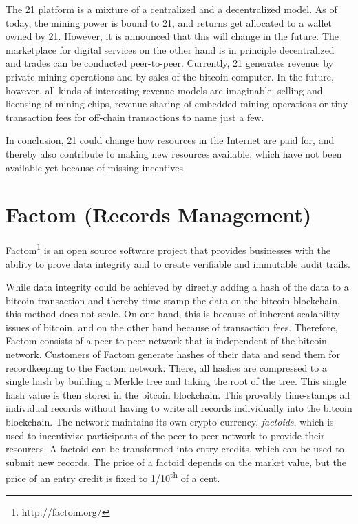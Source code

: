 The 21 platform is a mixture of a centralized and a decentralized model. As of 
today, the mining power is bound to 21, and returns get allocated to a wallet owned 
by 21. However, it is announced that this will change in the future. The marketplace 
for digital services on the other hand is in principle decentralized and trades 
can be conducted peer-to-peer. Currently, 21 generates revenue by private mining 
operations and by sales of the bitcoin computer. In the future, however, all kinds 
of interesting revenue models are imaginable: selling and licensing of mining chips, 
revenue sharing of embedded mining operations or tiny transaction fees for off-chain 
transactions to name just a few. 

In conclusion, 21 could change how resources in the Internet are paid for, and 
thereby also contribute to making new resources available, which have not been 
available yet because of missing incentives

\section{Factom (Records Management)}
\label{sec:ecofactom}

Factom\footnote{http://factom.org/} is an open source software project that provides businesses with 
the ability to prove data integrity and to create verifiable and immutable audit 
trails. 

While data integrity could be achieved by directly adding a hash of the data to 
a bitcoin transaction and thereby time-stamp the data on the bitcoin blockchain, 
this method does not scale. On one hand, this is because of inherent scalability 
issues of bitcoin, and on the other hand because of transaction fees. Therefore, 
Factom consists of a peer-to-peer network that is independent of the bitcoin network. 
Customers of Factom generate hashes of their data and send them for recordkeeping 
to the Factom network. There, all hashes are compressed to a single hash by building 
a Merkle tree and taking the root of the tree. This single hash 
value is then stored in the bitcoin blockchain. This provably time-stamps all individual 
records without having to write all records individually into the bitcoin blockchain. 
The network maintains its own crypto-currency, \emph{factoids}, which is used to incentivize 
participants of the peer-to-peer network to provide their resources. A factoid 
can be transformed into entry credits, which can be used to submit new records. 
The price of a factoid depends on the market value, but the price of an entry credit 
is fixed to 1/10\textsuperscript{th} of a cent. 

